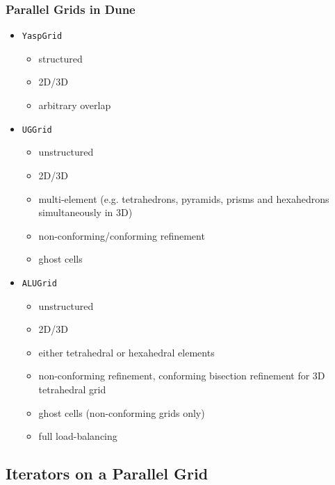 \begin{frame}
  \frametitle<presentation>{Parallel Grids in Dune}
  \begin{itemize}
  \item<1-> \lstinline!YaspGrid!
      \begin{itemize}
      \item structured
      \item 2D/3D
      \item arbitrary overlap
      \end{itemize}
  \item<2-> \lstinline!UGGrid!
      \begin{itemize}
      \item unstructured
      \item 2D/3D
      \item multi-element (e.g. tetrahedrons, pyramids, prisms and hexahedrons simultaneously in 3D)
      \item non-conforming/conforming refinement
      \item ghost cells
      \end{itemize}
  \item<3-> \lstinline!ALUGrid!
      \begin{itemize}
      \item unstructured
      \item 2D/3D
      \item either tetrahedral or hexahedral elements
      \item non-conforming refinement, conforming bisection refinement for 3D tetrahedral grid
      \item ghost cells (non-conforming grids only)
      \item full load-balancing
      \end{itemize}
  \end{itemize}
\end{frame}

\subsection{Iterators on a Parallel Grid}

